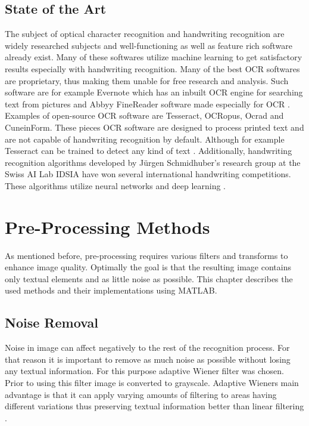 \documentclass{article}
\begin{document}
    \subsection{State of the Art}
      The subject of optical character recognition and handwriting recognition are widely researched subjects and well-functioning as well as feature rich software already exist. Many of these softwares utilize machine learning to get satisfactory results especially with handwriting recognition. Many of the best OCR softwares are proprietary, thus making them unable for free research and analysis. Such software are for example Evernote which has an inbuilt OCR engine for searching text from pictures \cite{Kelly} and Abbyy FineReader software made especially for OCR \cite{ABBYY}. Examples of open-source OCR software are Tesseract\cite{Smith2007a}, OCRopus\cite{Breuel2007}, Ocrad\cite{FreeSoftwareFoundation2016} and CuneinForm\cite{CognitiveTechnologies2016}. These pieces OCR software are designed to process printed text and are not capable of handwriting recognition by default. Although for example Tesseract can be trained to detect any kind of text \cite{Smith2007a}. Additionally, handwriting recognition algorithms developed by J{\"u}rgen Schmidhuber's research group at the Swiss AI Lab IDSIA have won several international handwriting competitions. These algorithms utilize neural networks and deep learning \cite{Angelica}.

  \newpage
  \section{Pre-Processing Methods}
  As mentioned before, pre-processing requires various filters and transforms to enhance image quality. Optimally the goal is that the resulting image contains only textual elements and as little noise as possible. This chapter describes the used methods and their implementations using MATLAB.

        \subsection{Noise Removal}
          Noise in image can affect negatively to the rest of the recognition process. For that reason it is important to remove as much noise as possible without losing any textual information. For this purpose adaptive Wiener filter was chosen. Prior to using this filter image is converted to grayscale. Adaptive Wieners main advantage is that it can apply varying amounts of filtering to areas having different variations thus preserving textual information better than linear filtering \cite{TheMathWorksWiener}.
\end{document}
